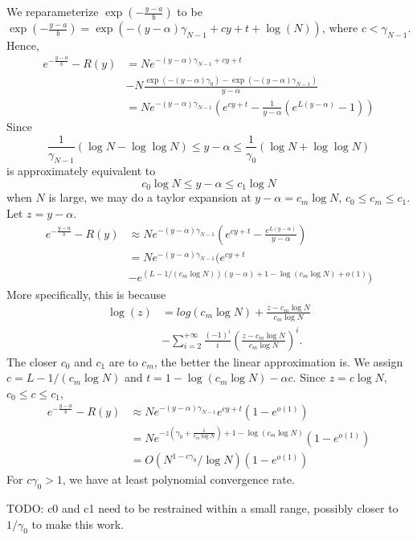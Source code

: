 We reparameterize $\exp(-\frac{y-a}{b})$ to be $\exp(-\frac{y-a}{b}) = \exp(-(y-\alpha)\gamma_{N-1} + cy + t+\log(N))$, where $c < \gamma_{N-1}$. Hence, 
\begin{align}
e^{-\frac{y-a}{b}} - R(y) &= N e^{-(y-\alpha)\gamma_{N-1} + cy + t} \\
& - N \frac{\exp{(-(y-\alpha)\gamma_0)} - \exp{(-(y-\alpha)\gamma_{N-1})}}{y-\alpha}\\
& = N e^{-(y-\alpha)\gamma_{N-1}} (e^{cy+t} - \frac{1}{y-\alpha}(e^{L(y-\alpha)}-1))
\end{align}
Since $$\frac{1}{\gamma_{N-1}}(\log N-\log\log N) \leq y -\alpha\leq \frac{1}{\gamma_0}(\log N+\log\log N)$$ is approximately equivalent to $$c_0\log N \leq y -\alpha\leq c_1\log N$$
when $N$ is large, we may do a taylor expansion at $y-\alpha = c_m \log N$, $c_0 \leq c_m \leq c_1$. Let $z=y-\alpha$. 
\begin{align} 
e^{-\frac{y-a}{b}} - R(y) & \approx N e^{-(y-\alpha)\gamma_{N-1}} (e^{cy+t} - \frac{e^{L(y-\alpha)}}{y-\alpha}) \\
& = N e^{-(y-\alpha)\gamma_{N-1}} (e^{cy+t} \\
&-e^{\left(L-1/(c_m\log N)\right)(y-\alpha)+1-\log(c_m\log N)+o(1)}) 
\end{align}
More specifically, this is because
\begin{align}
\log(z) & = log(c_m\log N) + \frac{z-c_m\log N}{c_m\log N}\\&-\sum_{i=2}^{+\infty} \frac{(-1)^i}{i}(\frac{z-c_m\log N}{c_m\log N})^i.
\end{align}
The closer $c_0$ and $c_1$ are to $c_m$, the better the linear approximation is. We assign $c=L-1/(c_m\log N)$ and $t=1-\log(c_m\log N)-\alpha c$. Since $z=c\log N$, $c_0\leq c \leq c_1$, 
\begin{align} 
e^{-\frac{y-a}{b}} - R(y) & \approx N e^{-(y-\alpha)\gamma_{N-1}} e^{cy+t}(1 -e^{o(1)}) \\
&= N e^{ -z(\gamma_0+\frac{1}{c_m\log N} ) + 1-\log(c_m\log N) }(1 -e^{o(1)})\\
&= O(N^{1-c\gamma_0}/\log N)(1 -e^{o(1)})
\end{align} 
For $c\gamma_0>1$, we have at least polynomial convergence rate.

TODO: c0 and c1 need to be restrained within a small range, possibly closer to $1/\gamma_0$ to make this work.